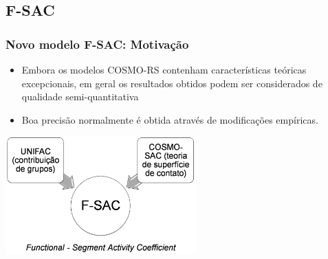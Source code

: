 \documentclass[aspectratio=169]{beamer}
\begin{document}
\subsection{F-SAC}
\begin{frame}[plain]
  \frametitle{Novo modelo F-SAC: Motivação}
  \begin{itemize} 
    \item Embora os modelos COSMO-RS contenham características teóricas excepcionais,
    	em geral os resultados obtidos podem ser considerados de qualidade semi-quantitativa
    \item Boa precisão normalmente é obtida através de modificações empíricas.
  \end{itemize}
  \begin{center}
  \includegraphics[width=0.55\textwidth]{img/fsac}
  \end{center}
\end{frame}
\end{document}
